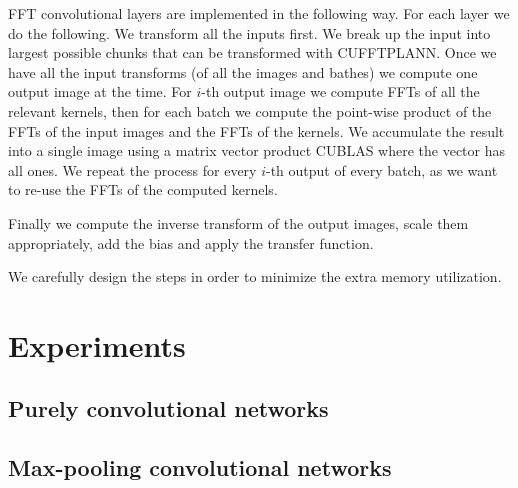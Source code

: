 \documentclass[conference]{IEEEtran}
\begin{document}
FFT convolutional layers are implemented in the following way.  For
each layer we do the following.  We transform all the inputs first.
We break up the input into largest possible chunks that can be
transformed with CUFFTPLANN.  Once we have all the input transforms
(of all the images and bathes) we compute one output image at the
time.  For $i$-th output image we compute FFTs of all the relevant
kernels, then for each batch we compute the point-wise product of the
FFTs of the input images and the FFTs of the kernels.  We accumulate
the result into a single image using a matrix vector product CUBLAS
where the vector has all ones.  We repeat the process for every $i$-th
output of every batch, as we want to re-use the FFTs of the computed
kernels.

Finally we compute the inverse transform of the output images, scale
them appropriately, add the bias and apply the transfer function.

We carefully design the steps in order to minimize the extra memory
utilization.


\section{Experiments}

\subsection{Purely convolutional networks}
\subsection{Max-pooling convolutional networks}
\end{document}
